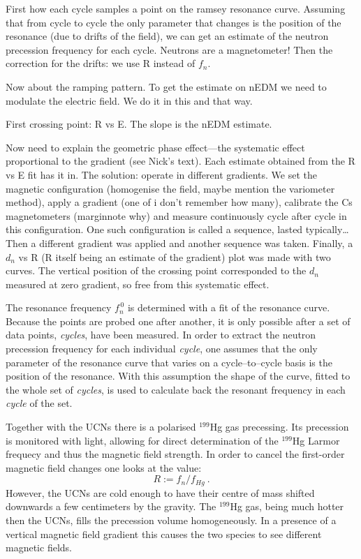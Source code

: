 First how each cycle samples a point on the ramsey resonance curve. Assuming that from cycle to cycle the only parameter that changes is the position of the resonance (due to drifts of the field), we can get an estimate of the neutron precession frequency for each cycle. Neutrons are a magnetometer! Then the correction for the drifts: we use R instead of $f_n$.

Now about the ramping pattern. To get the estimate on nEDM we need to modulate the electric field. We do it in this and that way.

First crossing point: R vs E. The slope is the nEDM estimate.

Now need to explain the geometric phase effect---the systematic effect proportional to the gradient (see Nick's text). Each estimate obtained from the R vs E fit has it in.
The solution: operate in different gradients. We set the magnetic configuration (homogenise the field, maybe mention the variometer method), apply a gradient (one of i don't remember how many), calibrate the Cs magnetometers (marginnote why) and measure continuously cycle after cycle in this configuration. One such configuration is called a sequence, lasted typically\ldots Then a different gradient was applied and another sequence was taken. Finally, a $d_n$ vs R (R itself being an estimate of the gradient) plot was made with two curves. The vertical position of the crossing point corresponded to the $d_n$ measured at zero gradient, so free from this systematic effect.


The resonance frequency $f_n^{\,0}$ is determined with a fit of the resonance curve. Because the points are probed one after another, it is only possible after a set of data points, \emph{cycles}, have been measured. In order to extract the neutron precession frequency for each individual \emph{cycle}, one assumes that the only parameter of the resonance curve that varies on a cycle--to--cycle basis is the position of the resonance. With this assumption the shape of the curve, fitted to the whole set of \emph{cycles}, is used to calculate back the resonant frequency in each \emph{cycle} of the set.

Together with the UCNs there is a polarised $^{199}$Hg gas precessing. Its precession is monitored with light, allowing for direct determination of the $^{199}$Hg Larmor frequecy and thus the magnetic field strength. In order to cancel the first-order magnetic field changes one looks at the value:
\begin{equation}
  R := f_n / f_{Hg} \ .
\end{equation}
However, the UCNs are cold enough to have their centre of mass shifted downwards a few centimeters by the gravity. The $^{199}$Hg gas, being much hotter then the UCNs, fills the precession volume homogeneously. In a presence of a vertical magnetic field gradient this causes the two species to see different magnetic fields.

